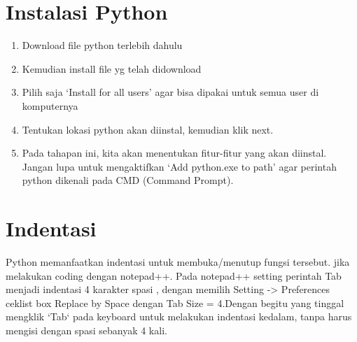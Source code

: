 \documentclass{article}
\begin{document}
\section{Instalasi Python}
\begin{enumerate}
\item
Download file python terlebih dahulu
\item
Kemudian install file yg telah didownload
\item
Pilih saja ‘Install for all users’ agar bisa dipakai untuk semua user di komputernya
\item
Tentukan lokasi python akan diinstal, kemudian klik next.
\item
Pada tahapan ini, kita akan menentukan fitur-fitur yang akan diinstal.
Jangan lupa untuk mengaktifkan ‘Add python.exe to path’ agar perintah python dikenali pada CMD (Command Prompt).
\end{enumerate}

\section{Indentasi}
\par
Python memanfaatkan indentasi untuk membuka/menutup fungsi tersebut. jika melakukan coding dengan notepad++. Pada notepad++ setting perintah Tab menjadi indentasi 4 karakter spasi , dengan memilih Setting -> Preferences ceklist box Replace by Space dengan Tab Size = 4.Dengan begitu yang tinggal mengklik ‘Tab‘ pada keyboard untuk melakukan indentasi kedalam, tanpa harus  mengisi dengan spasi sebanyak 4 kali.
\end{document}
